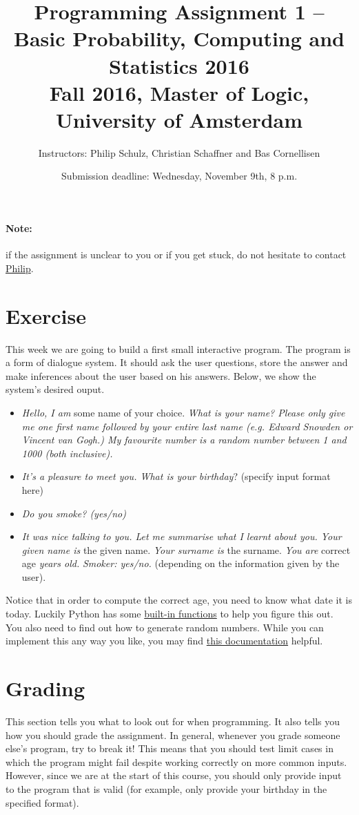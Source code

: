 \documentclass[11pt, leqno, a4paper]{article}
\title{Programming Assignment 1 -- Basic Probability, Computing and Statistics 2016 \\[2mm]
\large{Fall 2016, Master of Logic, University of Amsterdam}}
\author{Instructors: Philip Schulz, Christian Schaffner and Bas Cornellisen}
\date{Submission deadline: Wednesday, November 9th, 8 p.m.}
\begin{document}
\maketitle

\paragraph{Note:} if the assignment is unclear to you or if you get stuck, do not hesitate to contact \href{mailto:P.Schulz@uva.nl}{Philip}.

\section{Exercise}
This week we are going to build a first small interactive program. The program is a form of dialogue system. It should ask the user questions,
store the answer and make inferences about the user based on his answers. Below, we show the system's desired ouput. 
\begin{itemize}
\item \textit{Hello, I am} some name of your choice. \textit{What is
    your name? Please only give me one first name followed by your
    entire last name (e.g. \emph{Edward Snowden} or \emph{Vincent van Gogh}.) My favourite number
    is \emph{a random number between 1 and 1000 (both inclusive)}.}
\item \textit{It's a pleasure to meet you. What is your birthday}? (specify input format here)
\item \textit{Do you smoke? (yes/no)}
\item \textit{It was nice talking to you. Let me summarise what I learnt about you. Your given name is} the given name. \textit{Your surname is}
the surname. \textit{You are} correct age \textit{years old.} 
\textit{Smoker: yes/no.} (depending on the information given by the user).
\end{itemize}

Notice that in order to compute the correct age, you need to know what date it is today. Luckily
Python has some \href{https://docs.python.org/3/library/datetime.html}{built-in functions} to help
you figure this out. You also need to find out how to generate random numbers. While you can implement
this any way you like, you may find \href{https://docs.python.org/3/library/random.html}{this documentation} helpful.

\section{Grading}
This section tells you what to look out for when programming. It also tells you how you should grade the assignment. In general, whenever you grade 
someone else's program, try to break it! This means that you should test limit cases in which the program might fail despite working correctly
on more common inputs. However, since we are at the start of this course, you should only provide input
to the program that is valid (for example, only provide your birthday in the specified format).
\end{document}
